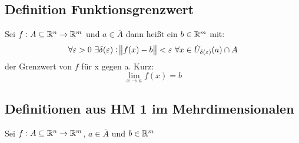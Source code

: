 \subsection{Definition Funktionsgrenzwert}
Sei $f: A \subseteq \mathbb{R}^n \rightarrow \mathbb{R}^m$ und $a \in \bar{A}$ dann heißt ein
$b \in \mathbb{R}^m$ mit:
\begin{equation*}
    \forall \varepsilon>0\ \exists \delta(\varepsilon):
    \norm{f(x) - b}<\varepsilon\
    \forall x \in \dot{U}_{\delta(\varepsilon)}(a) \cap A
\end{equation*}
der Grenzwert von $f$ für x gegen a. Kurz:
\begin{equation*}
    \lim_{x \rightarrow a} f(x) = b
\end{equation*}

\subsection{Definitionen aus HM 1 im Mehrdimensionalen}
Sei $f: A \subseteq \mathbb{R}^n \rightarrow \mathbb{R}^m$, $a \in \bar{A}$ und $b \in \mathbb{R}^m$
